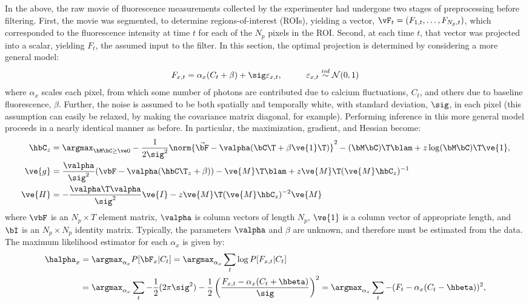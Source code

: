 In the above, the raw movie of fluorescence measurements collected by the experimenter had undergone two stages of preprocessing before filtering.  First, the movie was segmented, to determine regions-of-interest (ROIs), yielding a vector, $\vF_t=(F_{1,t}, \ldots, F_{N_p,t})$, which corresponded to the fluorescence intensity at time $t$ for each of the $N_p$ pixels in the ROI.  Second, at each time $t$, that vector was projected into a scalar, yielding $F_t$, the assumed input to the filter.  In this section, the optimal projection is determined by considering a more general model:
\begin{align} \label{eq:bF}
F_{x,t} &= \alpha_x (C_t + \beta) +  \sig \varepsilon_{x,t}, \qquad &\varepsilon_{x,t} \overset{iid}{\sim} \mathcal{N}(0,1)   
\end{align}
\noindent where $\alpha_x$ scales each pixel, from which some number of photons are contributed due to calcium fluctuations, $C_t$, and others due to baseline fluorescence, $\beta$.  Further, the noise is assumed to be both spatially and temporally white, with standard deviation, $\sig$, in each pixel (this assumption can easily be relaxed, by making the covariance matrix diagonal, for example).  Performing inference in this more general model proceeds in a  nearly identical manner as before. In particular, the maximization, gradient, and Hessian become:
\begin{align} 
\hbC_{\zzz} 
&= \az  -\frac{1}{2 \sig^2} \norm{\vec{\bF} - \valpha (\bC\T +\beta\ve{1}\T)}^2 - (\bM \bC )\T \blam  + \zzz \log(\bM \bC)\T\ve{1},  \label{eq:eta4}\\
\ve{g} &= \frac{\valpha}{\sig^2}(\vbF -\valpha({\hbC\T}_{\zzz} + \beta)) - \ve{M}\T\blam + \zzz \ve{M}\T (\ve{M} \hbC_{\zzz})^{-1} \label{eq:g2} \\
\ve{H} &= -\frac{\valpha\T \valpha}{\sig^2} \ve{I} - \zzz \ve{M}\T (\ve{M} \hbC_{\zzz})^{-2} \ve{M} \label{eq:H2}
\end{align}
\noindent where $\vbF$ is an $N_p \times T$ element matrix, $\valpha$ is column vectors of length $N_p$, $\ve{1}$ is  a column vector of appropriate length, and $\bI$ is an $N_p \times N_p$ identity matrix.  Typically, the parameters  $\valpha$ and $\beta$ are unknown, and therefore must be estimated from the data.  The maximum likelihood estimator for each $\alpha_x$ is given by:
\begin{subequations}
\begin{align}
\halpha_x &= \argmax_{\alpha_x} P[\bF_x | C_t] = \argmax_{\alpha_x} \sum_t \log P[F_{x,t} | C_t] \\
&=\argmax_{\alpha_x} \sum_t -\frac{1}{2} (2\pi \sig^2) - \frac{1}{2}\left(\frac{F_{x,t} - \alpha_x (C_t + \hbeta)}{\sig}\right)^2 %
= \argmax_{\alpha_x} \sum_t - (F_t - \alpha_x(C_t - \hbeta))^2, \label{eq:alpha_x}
\end{align}
\end{subequations}
